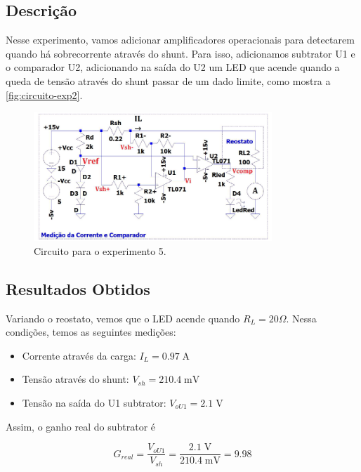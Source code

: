 \documentclass[
	12pt,				%
	oneside,			%
	a4paper,			%
	chapter=TITLE,
	sumario=tradicional,
	english,			%
	brazil				%
]{abntex2}
\newcommand{\un}[1]{\;\text{#1}}
\begin{document}
\subsection{Descrição}

Nesse experimento, vamos adicionar amplificadores operacionais para detectarem quando há sobrecorrente através do shunt.
Para isso, adicionamos subtrator U1 e o comparador U2, adicionando na saída do U2 um LED que acende quando a queda de tensão 
através do shunt passar de um dado limite, como mostra a \autoref{fig:circuito-exp2}.

\begin{figure}[h!]
	\caption{\label{fig:circuito-exp2}Circuito para o experimento 5.}
	\begin{center}
    \includegraphics[width=0.8\textwidth,trim=1 1 1 1,clip]{images/circuito-exp2.png}
	\end{center}
\end{figure}

\subsection{Resultados Obtidos}

Variando o reostato, vemos que o LED acende quando $R_L = 20 \Omega$. Nessa condições, 
temos as seguintes medições:

\begin{itemize}
	\item Corrente através da carga: $I_L = 0.97 \un{A}$
	\item Tensão através do shunt: $V_{sh} = 210.4 \un{mV}$
	\item Tensão na saída do U1 subtrator: $V_{oU1} = 2.1 \un{V}$
\end{itemize}

Assim, o ganho real do subtrator é

\[ G_{real} = \frac{V_{oU1}}{V_{sh}} = \frac{2.1 \un{V}}{210.4 \un{mV}} = 9.98 \]
\end{document}

